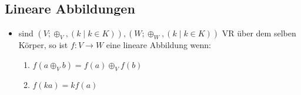 \documentclass[10pt,a4paper]{article}
\begin{document}
\subsection{Lineare Abbildungen}
\begin{itemize}
\item sind $(V; \oplus_{V}, (k\mid k\in K)),(W; \oplus_{W}, (k\mid k\in K))$ VR über dem selben Körper, so ist $f:V \rightarrow W$ eine lineare Abbildung wenn:
\begin{enumerate}
\item $f(a \oplus_{V} b) =f(a)\oplus_{V} f(b)$
\item $f(ka)=kf(a)$
\end{enumerate}



\end{itemize}
\end{document}
